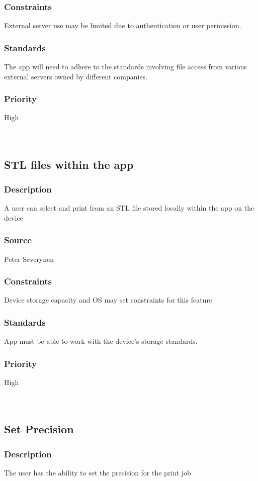 \subsubsection{Constraints}
External server use may be limited due to authentication or user permission.
\subsubsection{Standards}
The app will need to adhere to the standards involving file access from various external servers owned by different companies.
\subsubsection{Priority}
High\\
\\
\\
\subsection{STL files within the app}
\subsubsection{Description}
A user can select and print from an STL file stored locally within the app on the device
\subsubsection{Source}
Peter Severynen
\subsubsection{Constraints}
Device storage capacity and OS may set constraints for this feature
\subsubsection{Standards}
App must be able to work with the device's storage standards.
\subsubsection{Priority}
High\\
\\
\\
\subsection{Set Precision}
\subsubsection{Description}
The user has the ability to set the precision for the print job
